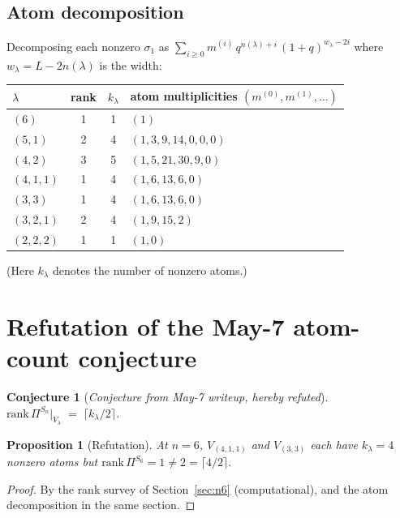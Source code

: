 \documentclass[11pt]{article}
\newtheorem{proposition}[theorem]{Proposition}
\newtheorem{conjecture}[theorem]{Conjecture}
\theoremstyle{definition}
\begin{document}
\subsection{Atom decomposition}

Decomposing each nonzero $\sigma_1$ as
$\sum_{i \geq 0} m^{(i)}\, q^{n(\lambda) + i}\,(1+q)^{w_\lambda - 2i}$
where $w_\lambda = L - 2 n(\lambda)$ is the width:

\begin{center}
\begin{tabular}{l c c l}
\toprule
$\lambda$ & rank & $k_\lambda$ & atom multiplicities $(m^{(0)}, m^{(1)}, \ldots)$ \\
\midrule
$(6)$         & 1 & 1 & $(1)$ \\
$(5, 1)$      & 2 & 4 & $(1, 3, 9, 14, 0, 0, 0)$ \\
$(4, 2)$      & 3 & 5 & $(1, 5, 21, 30, 9, 0)$ \\
$(4, 1, 1)$   & 1 & 4 & $(1, 6, 13, 6, 0)$ \\
$(3, 3)$      & 1 & 4 & $(1, 6, 13, 6, 0)$ \\
$(3, 2, 1)$   & 2 & 4 & $(1, 9, 15, 2)$ \\
$(2, 2, 2)$   & 1 & 1 & $(1, 0)$ \\
\bottomrule
\end{tabular}
\end{center}

(Here $k_\lambda$ denotes the number of nonzero atoms.)

\section{Refutation of the May-7 atom-count conjecture}\label{sec:refute}

\begin{conjecture}[\emph{Conjecture from May-7 writeup, hereby refuted}]
\label{conj:atom-half}
$\mathrm{rank}\,\Pi^{S_n}|_{V_\lambda}\;=\;\lceil k_\lambda / 2 \rceil$.
\end{conjecture}

\begin{proposition}[Refutation]
At $n = 6$, $V_{(4,1,1)}$ and $V_{(3,3)}$ each have $k_\lambda = 4$
nonzero atoms but $\mathrm{rank}\,\Pi^{S_6} = 1 \neq 2 = \lceil 4/2 \rceil$.
\end{proposition}

\begin{proof}
By the rank survey of Section~\ref{sec:n6} (computational), and the
atom decomposition in the same section.
\end{proof}
\end{document}
